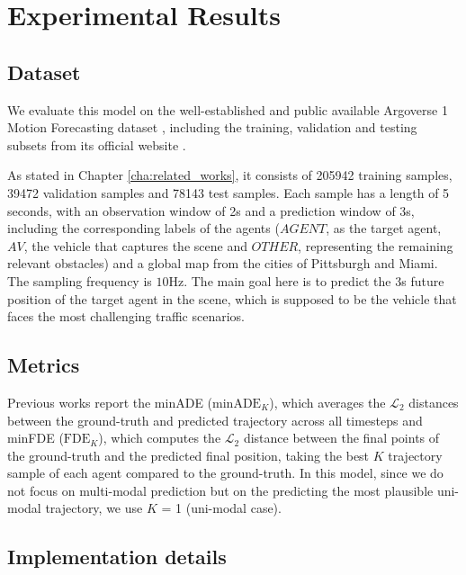 \section{Experimental Results}
\label{sec:5_experimental_results}

\subsection{Dataset}
\label{subsec:5_dataset}

We evaluate this model on the well-established and public available Argoverse 1 Motion Forecasting dataset \cite{chang2019argoverse}, including the training, validation and testing subsets from its official website \cite{argobench}. 

As stated in Chapter \ref{cha:related_works}, it consists of 205942 training samples, 39472 validation samples and 78143 test samples. Each sample has a length of 5 seconds, with an observation window of 2s and a prediction window of 3s, including the corresponding labels of the agents ($AGENT$, as the target agent, $AV$, the vehicle that captures the scene and $OTHER$, representing the remaining relevant obstacles) and a global map from the cities of Pittsburgh and Miami. The sampling frequency is $10\mathrm{Hz}$. The main goal here is to predict the 3s future position of the target agent in the scene, which is supposed to be the vehicle that faces the most challenging traffic scenarios.

\subsection{Metrics}
\label{subsec:5_metrics}

Previous works \cite{chai2019multipath, mercat2020multi, sadeghian2019sophie} report the \ac{minADE} ($\text{minADE}_K$), which averages the $\mathcal{L}_2$ distances between the ground-truth and predicted trajectory across all timesteps and \ac{minFDE} ($\text{FDE}_K$), which computes the $\mathcal{L}_2$ distance between the final points of the ground-truth and the predicted final position, taking the best $K$ trajectory sample of each agent compared to the ground-truth. In this model, since we do not focus on multi-modal prediction but on the predicting the most plausible uni-modal trajectory, we use $K$ = 1 (uni-modal case).

\subsection{Implementation details}
\label{subsec:5_implementation_details}

